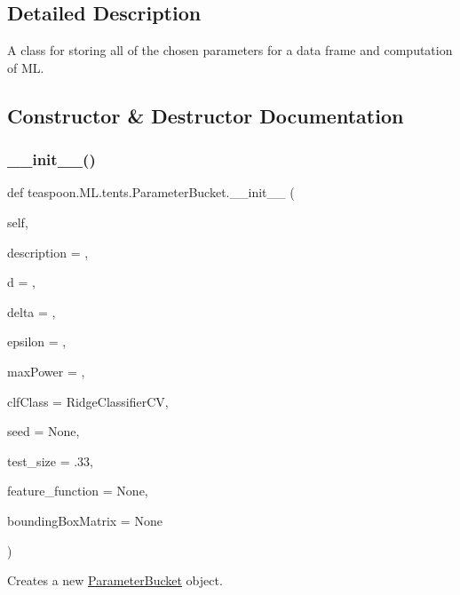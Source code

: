 \subsection{Detailed Description}
A class for storing all of the chosen parameters for a data frame and computation of ML. 

\subsection{Constructor \& Destructor Documentation}
\mbox{\label{classteaspoon_1_1_m_l_1_1tents_1_1_parameter_bucket_a560cd613a020c1081f2ac0fa8caec4c5}} 
\subsubsection{\texorpdfstring{\+\_\+\+\_\+init\+\_\+\+\_\+()}{\_\_init\_\_()}}
{\footnotesize\ttfamily def teaspoon.\+M\+L.\+tents.\+Parameter\+Bucket.\+\_\+\+\_\+init\+\_\+\+\_\+ (\begin{DoxyParamCaption}\item[{}]{self,  }\item[{}]{description = {\ttfamily \textquotesingle{}\textquotesingle{}},  }\item[{}]{d = {},  }\item[{}]{delta = {},  }\item[{}]{epsilon = {},  }\item[{}]{max\+Power = {},  }\item[{}]{clf\+Class = {\ttfamily RidgeClassifierCV},  }\item[{}]{seed = {\ttfamily None},  }\item[{}]{test\+\_\+size = {\ttfamily .33},  }\item[{}]{feature\+\_\+function = {\ttfamily None},  }\item[{}]{bounding\+Box\+Matrix = {\ttfamily None} }\end{DoxyParamCaption})}



Creates a new \hyperlink{classteaspoon_1_1_m_l_1_1tents_1_1_parameter_bucket}{Parameter\+Bucket} object. 

